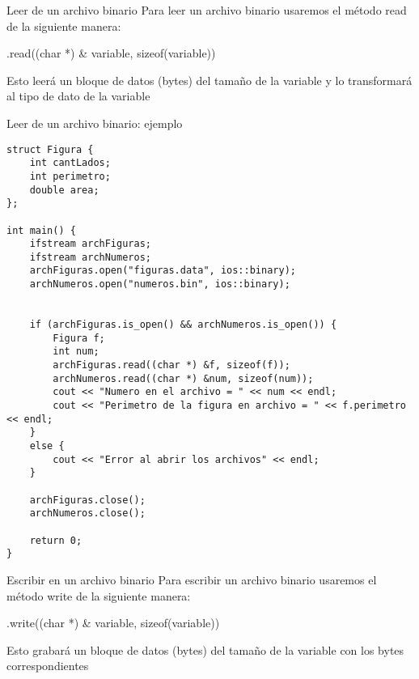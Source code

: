 \documentclass[12pt]{beamer}
\begin{document}
\begin{frame}{Leer de un archivo binario}
    Para leer un archivo binario usaremos el método \alert{read} de la siguiente manera: \\
    \begin{center}
         .read((char *) \& \alert{variable}, sizeof(\alert{variable}))
    \end{center}
    Esto leerá un bloque de datos (bytes) del tamaño de la variable y lo transformará al tipo de dato de la variable
\end{frame}

\begin{frame}[fragile]{Leer de un archivo binario: ejemplo}
\begin{lstlisting}[basicstyle=\tiny]
struct Figura {
	int cantLados;
	int perimetro;
	double area;
};

int main() {
	ifstream archFiguras;
	ifstream archNumeros;
	archFiguras.open("figuras.data", ios::binary);
	archNumeros.open("numeros.bin", ios::binary);
	
	
	if (archFiguras.is_open() && archNumeros.is_open()) {
		Figura f;
		int num;
		archFiguras.read((char *) &f, sizeof(f));
		archNumeros.read((char *) &num, sizeof(num));
		cout << "Numero en el archivo = " << num << endl;
		cout << "Perimetro de la figura en archivo = " << f.perimetro << endl;
	}
	else {
		cout << "Error al abrir los archivos" << endl;
	}
	
	archFiguras.close();
	archNumeros.close();
	
	return 0;
}
\end{lstlisting}
\end{frame}

\begin{frame}[fragile]{Escribir en un archivo binario}
    Para escribir un archivo binario usaremos el método \alert{write} de la siguiente manera: \\
    \begin{center}
        .write((char *) \& \alert{variable}, sizeof(\alert{variable})) \\
    \end{center}
    Esto grabará un bloque de datos (bytes) del tamaño de la variable con los bytes correspondientes \\
\end{frame}
\end{document}
